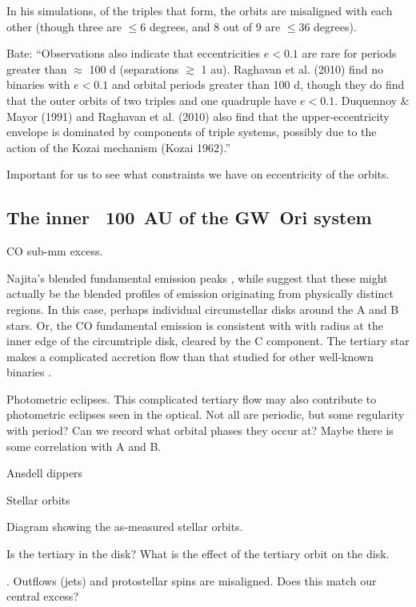 \documentclass[twocolumn]{aastex6}
\begin{document}
In his simulations, of the triples that form, the orbits are misaligned with each other (though three are $\leq 6$ degrees, and 8 out of 9 are $\leq 36$ degrees).

Bate:  ``Observations also indicate that eccentricities $e < 0.1$ are rare for periods greater than $\approx$ 100 d (separations $\gtrsim$ 1 au). Raghavan et al. (2010) find no binaries with $e < 0.1$ and orbital periods greater than 100 d, though they do find that the outer orbits of two triples and one quadruple have $e < 0.1$. Duquennoy \& Mayor (1991) and Raghavan et al. (2010) also find that the upper-eccentricity envelope is dominated by components of triple systems, possibly due to the action of the Kozai mechanism (Kozai 1962).''

Important for us to see what constraints we have on eccentricity of the orbits.



\subsection{The inner ~100 \,AU of the GW~Ori system} \label{sec:inner disk}

CO sub-mm excess.

Najita's blended fundamental emission peaks \citep{najita03}, while \citet{bast11} suggest that these might actually be the blended profiles of emission originating from physically distinct regions. In this case, perhaps individual circumstellar disks around the A and B stars. Or, the CO fundamental emission is consistent with with radius at the inner edge of the circumtriple disk, cleared by the C component. The tertiary star makes a complicated accretion flow than that studied for other well-known binaries \citep[e.g., DQ~Tau;]{artymowicz94,mathieu97}.

Photometric eclipses. This complicated tertiary flow may also contribute to photometric eclipses seen in the optical. Not all are periodic, but some regularity with period? Can we record what orbital phases they occur at? Maybe there is some correlation with A and B.

Ansdell dippers

Stellar orbits

Diagram showing the as-measured stellar orbits.

Is the tertiary in the disk? What is the effect of the tertiary orbit on the disk.

\citep{offner16}. Outflows (jets) and protostellar spins are misaligned. Does this match our central excess?
\end{document}
